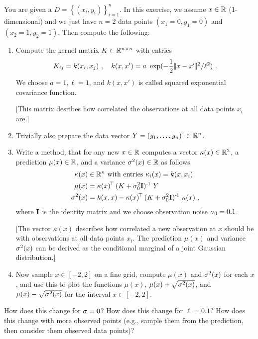 You are given a $D = \left\{(x_i,y_i)\right\}_{i=1}^n$. In this exercise, we assume $x\in{\mathbb{R}}$ (1-dimensional) and we just have $n=2$ data points $(x_1=0,y_1=0)$ and $(x_2=1,y_2=1)$. Then compute the following:
\begin{enumerate}
\item Compute the kernel matrix $K\in{\mathbb{R}}^{n\times n}$ with entries
$$K_{ij} = k(x_i,x_j) ~,\quad k(x,x') = a~ \exp(- \frac{1}{2} |\!|x-x'|\!|^2/\ell^2 ) ~.$$
We choose $a=1, \ell=1$, and $k(x,x')$ is called squared exponential covariance function.

{\small [This matrix desribes how correlated the observations at all data points $x_i$ are.]

}
\item Trivially also prepare the data vector $Y = (y_1,\ldots, y_n)^{\!\top\!} \in {\mathbb{R}}^n$.

\item Write a method, that for any new $x\in{\mathbb{R}}$ computes a vector $\kappa(x)\in{\mathbb{R}}^2$, a prediction $\mu(x)\in{\mathbb{R}}$, and a variance $\sigma^2(x)\in{\mathbb{R}}$ as follows
\begin{align}
\kappa(x) &\in{\mathbb{R}}^n ~\text{with entries}~ \kappa_i(x) = k(x,x_i) \\
\mu(x) &= \kappa(x)^{\!\top\!}~ (K + \sigma_0^2 {\rm\bf I})^{{\hspace*{-.0pt}\text{\rm -}\hspace*{-.5pt}}1}~ Y\\
\sigma^2(x) &= k(x,x) - \kappa(x)^{\!\top\!}~ (K + \sigma_0^2 {\rm\bf I})^{{\hspace*{-.0pt}\text{\rm -}\hspace*{-.5pt}}1}~ \kappa(x) ~,
\end{align}
where ${\rm\bf I}$ is the identity matrix and we choose observation noise $\sigma_0=0.1$.

{\small [The vector $\kappa(x)$ describes how correlated a new observation at $x$ should be with observations at all data points $x_i$. The prediction $\mu(x)$ and variance $\sigma^2(x)$ can be derived as the conditional marginal of a joint Gaussian distribution.]

}

\item Now sample $x\in[-2,2]$ on a fine grid, compute $\mu(x)$ and $\sigma^2(x)$ for each $x$, and use this to plot the functions $\mu(x)$, $\mu(x)+\sqrt{\sigma^2(x)}$, and $\mu(x)-\sqrt{\sigma^2(x)}$ for the interval $x\in[-2,2]$.
\end{enumerate}

How does this change for $\sigma=0$? How does this change for $\ell=0.1$? How does this change with more observed points (e.g., sample them from the prediction, then consider them observed data points)?


